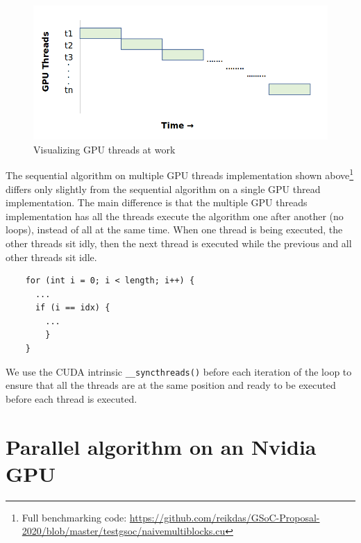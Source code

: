 \documentclass{article}
\begin{document}
\begin{figure}[H]
\includegraphics[width=\textwidth]{Graphics/naivemulti.PNG}
\caption{Visualizing GPU threads at work}
\end{figure}
\begin{mdframed}[backgroundcolor=light-gray, roundcorner=10pt,leftmargin=0.5, rightmargin=0.5, innertopmargin=1,innerbottommargin=1, outerlinewidth=1, linecolor=light-gray]

\end{mdframed}
The sequential algorithm on multiple GPU threads implementation shown above\footnote{Full benchmarking code: \url{https://github.com/reikdas/GSoC-Proposal-2020/blob/master/testgsoc/naivemultiblocks.cu}} differs only slightly from the sequential algorithm on a single GPU thread implementation.
\smallbreak
\noindent The main difference is that the multiple GPU threads implementation has all the threads execute the algorithm one after another (no loops), instead of all at the same time. When one thread is being executed, the other threads sit idly, then the next thread is executed while the previous and all other threads sit idle.
\begin{mdframed}[backgroundcolor=light-gray, roundcorner=10pt,leftmargin=0.5, rightmargin=0.5, innertopmargin=1,innerbottommargin=1, outerlinewidth=1, linecolor=light-gray]
\begin{lstlisting}
    for (int i = 0; i < length; i++) {
      ...
      if (i == idx) {
        ... 
        }
    }
\end{lstlisting}
\end{mdframed}
We use the CUDA intrinsic \texttt{__syncthreads()} before each iteration of the loop to ensure that all the threads are at the same position and ready to be executed before each thread is executed.

\section{Parallel algorithm on an Nvidia GPU}
\end{document}
